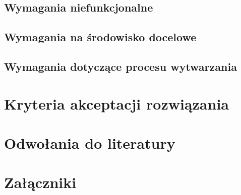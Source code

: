 \documentclass[11pt,oneside,a4paper,titlepage,onecolumn]{article}
\begin{document}
\subsection{Wymagania niefunkcjonalne}

\subsection{Wymagania na środowisko docelowe}

\subsection{Wymagania dotyczące procesu wytwarzania}

\section{Kryteria akceptacji rozwiązania}

\section{Odwołania do literatury}

\section{Załączniki}





\end{document}
